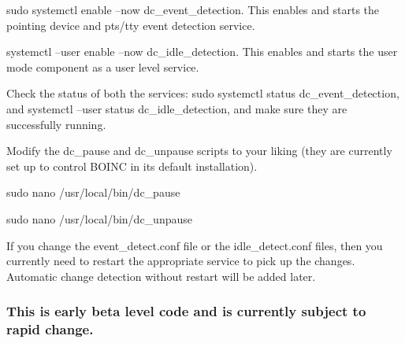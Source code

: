\begin{DoxyEnumerate}
\item sudo systemctl enable --now dc\+\_\+event\+\_\+detection. This enables and starts the pointing device and pts/tty event detection service.
\item systemctl --user enable --now dc\+\_\+idle\+\_\+detection. This enables and starts the user mode component as a user level service.
\item Check the status of both the services\+: sudo systemctl status dc\+\_\+event\+\_\+detection, and systemctl --user status dc\+\_\+idle\+\_\+detection, and make sure they are successfully running.
\item Modify the dc\+\_\+pause and dc\+\_\+unpause scripts to your liking (they are currently set up to control B\+O\+I\+NC in its default installation).
\end{DoxyEnumerate}
\begin{DoxyItemize}
\item sudo nano /usr/local/bin/dc\+\_\+pause
\item sudo nano /usr/local/bin/dc\+\_\+unpause
\end{DoxyItemize}
\begin{DoxyEnumerate}
\item If you change the event\+\_\+detect.\+conf file or the idle\+\_\+detect.\+conf files, then you currently need to restart the appropriate service to pick up the changes. Automatic change detection without restart will be added later.
\end{DoxyEnumerate}

\subsubsection*{This is early beta level code and is currently subject to rapid change.}